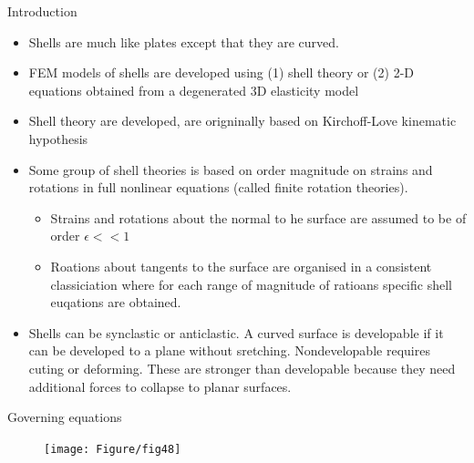 	
	\begin{frame}{Introduction}
		\begin{itemize}
			\item Shells are much like plates except that they are curved. 
			\item FEM models of shells are developed using (1) shell theory or (2) 2-D equations obtained from a degenerated 3D elasticity model 
			\item Shell theory are developed, are origninally based on Kirchoff-Love kinematic hypothesis
			\item Some group of shell theories is based on order magnitude on strains and rotations in full nonlinear equations (called finite rotation theories). 
			\begin{itemize}
				\item Strains and rotations about the normal to he surface are assumed to be of order $\epsilon<<1$
				\item Roations about tangents to the surface are organised in a consistent classiciation where for each range of magnitude of ratioans specific shell euqations are obtained. 
			\end{itemize}
		\item Shells can be synclastic or anticlastic. A curved surface is developable if it can be developed to a plane without sretching. Nondevelopable requires cuting or deforming. These are stronger than developable because they need additional forces to collapse to planar surfaces. 
		\end{itemize}
	\end{frame}


	\begin{frame}{Governing equations}
		\begin{figure}
			\centering
			\texttt{[image: Figure/fig48]}  		
		\end{figure}
	\end{frame}


